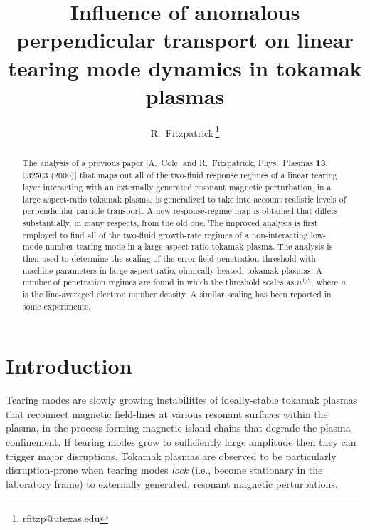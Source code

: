 \documentclass[12pt,prb,aps]{revtex4-1}
\begin{document}
\title{Influence of anomalous perpendicular transport on linear tearing mode dynamics in tokamak plasmas}

\author{R.~Fitzpatrick\,\footnote{rfitzp@utexas.edu}}

\begin{abstract}
The analysis of a previous paper [A.~Cole, and R.~Fitzpatrick, Phys.\ Plasmas {\bf 13}, 032503 (2006)] that maps out all of the
two-fluid response regimes of a  linear tearing layer interacting with an externally generated resonant magnetic perturbation, in a large aspect-ratio tokamak plasma,  is generalized to
take into account realistic levels of perpendicular particle transport. A new response-regime map is obtained that differs substantially, in many
respects, from the old one. The improved analysis is first employed to find all of the two-fluid growth-rate regimes of a non-interacting low-mode-number tearing mode in a large aspect-ratio tokamak plasma. 
The analysis is then used to determine the scaling of the error-field penetration threshold with machine
parameters in large aspect-ratio, ohmically heated, tokamak plasmas. A number of penetration regimes are found in which the threshold scales as $n^{1/2}$, where $n$ is the line-averaged
electron number density. A similar scaling has been reported in some experiments. 
\end{abstract}

\maketitle

\section{Introduction}
Tearing modes are slowly growing instabilities of ideally-stable tokamak plasmas that reconnect magnetic field-lines
at various resonant surfaces within the plasma, in the process forming magnetic island chains that degrade the plasma confinement.\cite{wes}
If tearing modes grow to sufficiently large amplitude then they can trigger major disruptions.\cite{wes1}  Tokamak
plasmas are observed to be particularly disruption-prone when tearing modes {\em lock}\/ (i.e., become stationary in the
laboratory frame) to externally generated, resonant magnetic perturbations.\cite{vries}  
\end{document}

